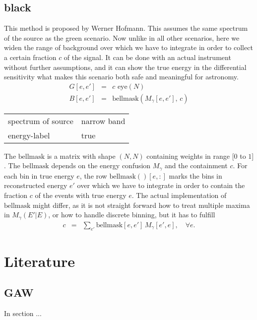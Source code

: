 \documentclass{article}%
\begin{document}
        \subsection{black}
            This method is proposed by Werner Hofmann.
            This assumes the same spectrum of the source as the green scenario.
            Now unlike in all other scenarios, here we widen the range of background over which we have to integrate in order to collect a certain fraction $c$ of the signal.
            It can be done with an actual instrument without further assumptions, and it can show the true energy in the differential sensitivity what makes this scenario both safe and meaningful for astronomy.
            \begin{eqnarray}
                G[e, e'] &=& c \, \, \mathrm{eye}(N)
                \\
                B[e, e'] &=& \mathrm{bellmask}(M_{\gamma}[e, e'], \, c)
            \end{eqnarray}
            \begin{center}
                \begin{tabular}{ll}
                    spectrum of source & narrow band\\
                    energy-label & true\\
                \end{tabular}
            \end{center}
            The $\mathrm{bellmask}$ is a matrix with shape $(N,N)$ containing weights in range $[0$ to $1]$.
            The $\mathrm{bellmask}$ depends on the energy confusion $M_{\gamma}$ and the containment $c$.
            For each bin in true energy $e$, the row $\mathrm{bellmask}()[e, :]$ marks the bins in reconstructed energy $e'$ over which we have to integrate in order to contain the fraction $c$ of the events with true energy $e$.
            The actual implementation of $\mathrm{bellmask}$ might differ, as it is not straight forward how to treat multiple maxima in $M_\gamma(E'\vert E)$, or how to handle discrete binning, but it has to fulfill
            \begin{eqnarray}
                c &=& \sum_{e'} \mathrm{bellmask}[e ,e'] \, M_{\gamma}[e', e], \,\,\,\,\,\, \forall e.
            \end{eqnarray}
    \section{Literature}
        \subsection{GAW \citep{cusumano2001gaw}}
            In section ...
\end{document}
